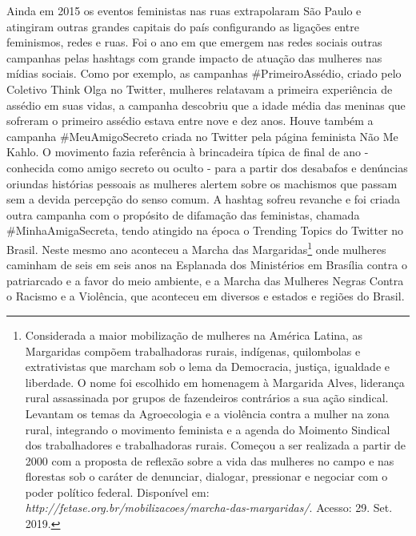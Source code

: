 Ainda em 2015 os eventos feministas nas ruas extrapolaram São Paulo e
atingiram outras grandes capitais do país configurando as ligações entre
feminismos, redes e ruas. Foi o ano em que emergem nas redes sociais
outras campanhas pelas hashtags com grande impacto de atuação das
mulheres nas mídias sociais. Como por exemplo, as campanhas \#PrimeiroAssédio, 
criado pelo Coletivo Think Olga no Twitter, mulheres relatavam
a primeira experiência de assédio em suas vidas, a campanha descobriu
que a idade média das meninas que sofreram o primeiro assédio estava
entre nove e dez anos. Houve também a campanha \#MeuAmigoSecreto criada
no Twitter pela página feminista Não Me Kahlo. O movimento fazia
referência à brincadeira típica de final de ano - conhecida como amigo
secreto ou oculto - para a partir dos desabafos e denúncias oriundas
histórias pessoais as mulheres alertem sobre os machismos que passam sem
a devida percepção do senso comum. A hashtag sofreu revanche e foi
criada outra campanha com o propósito de difamação das feministas,
chamada \#MinhaAmigaSecreta, tendo atingido na época o Trending Topics
do Twitter no Brasil. Neste mesmo ano aconteceu a Marcha das
Margaridas\footnote{Considerada a maior mobilização de mulheres na
  América Latina, as Margaridas compõem trabalhadoras rurais, indígenas,
  quilombolas e extrativistas que marcham sob o lema da Democracia,
  justiça, igualdade e liberdade. O nome foi escolhido em homenagem à
  Margarida Alves, liderança rural assassinada por grupos de fazendeiros
  contrários a sua ação sindical. Levantam os temas da Agroecologia e a
  violência contra a mulher na zona rural, integrando o movimento
  feminista e a agenda do Moimento Sindical dos trabalhadores e
  trabalhadoras rurais. Começou a ser realizada a partir de 2000 com a
  proposta de reflexão sobre a vida das mulheres no campo e nas
  florestas sob o caráter de denunciar, dialogar, pressionar e negociar
  com o poder político federal. Disponível em:
  \emph{http://fetase.org.br/mobilizacoes/marcha-das-margaridas/}.
  Acesso: 29. Set. 2019.} onde mulheres caminham de seis em seis anos na
Esplanada dos Ministérios em Brasília contra o patriarcado e a favor do
meio ambiente, e a Marcha das Mulheres Negras Contra o Racismo e a
Violência, que aconteceu em diversos e estados e regiões do Brasil.

